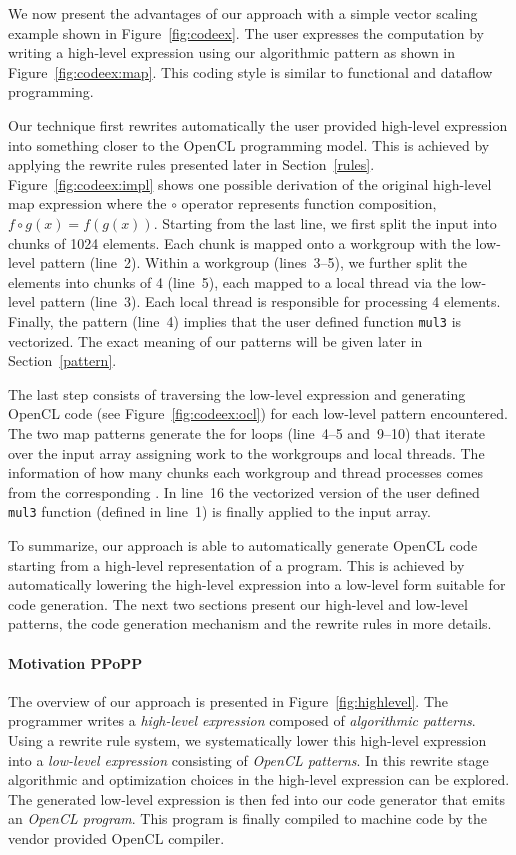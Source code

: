 We now present the advantages of our approach with a simple vector scaling example shown in Figure~\ref{fig:codeex}.
The user expresses the computation by writing a high-level expression using our  algorithmic pattern as shown in Figure~\ref{fig:codeex:map}.
This coding style is similar to functional and dataflow programming.

Our technique first rewrites automatically the user provided high-level expression into something closer to the OpenCL programming model.
This is achieved by applying the rewrite rules presented later in Section~\ref{rules}.
Figure~\ref{fig:codeex:impl} shows one possible derivation of the original high-level map expression where the $\circ$ operator represents function composition, \ie $f \circ g(x) = f(g(x))$.
Starting from the last line, we first split the input into chunks of 1024 elements.
Each chunk is mapped onto a workgroup with the  low-level pattern (line~2).
Within a workgroup (lines~3--5), we further split the elements into chunks of 4 (line~5), each mapped to a local thread via the  low-level pattern (line~3).
Each local thread is responsible for processing 4 elements.
Finally, the  pattern (line~4) implies that the user defined function \texttt{mul3} is vectorized.
The exact meaning of our patterns will be given later in Section~\ref{pattern}.

The last step consists of traversing the low-level expression and generating OpenCL code (see Figure~\ref{fig:codeex:ocl}) for each low-level pattern encountered.
The two map patterns generate the for loops (line~4--5 and~9--10) that iterate over the input array assigning work to the workgroups and local threads.
The information of how many chunks each workgroup and thread processes comes from the corresponding .
In line~16 the vectorized version of the user defined \texttt{mul3} function (defined in line~1) is finally applied to the input array.

To summarize, our approach is able to automatically generate OpenCL code starting from a high-level representation of a program.
This is achieved by automatically lowering the high-level expression into a low-level form suitable for code generation.
The next two sections present our high-level and low-level patterns, the code generation mechanism and the rewrite rules in more details.

\paragraph{Motivation PPoPP}
The overview of our approach is presented in Figure~\ref{fig:highlevel}.
The programmer writes a \emph{high-level expression} composed of \emph{algorithmic patterns}.
Using a rewrite rule system, we systematically lower this high-level expression into a \emph{low-level expression} consisting of \emph{OpenCL patterns}.
In this rewrite stage algorithmic and optimization choices in the high-level expression can be explored.
The generated low-level expression is then fed into our code generator that emits an \emph{OpenCL program}.
This program is finally compiled to machine code by the vendor provided OpenCL compiler.

